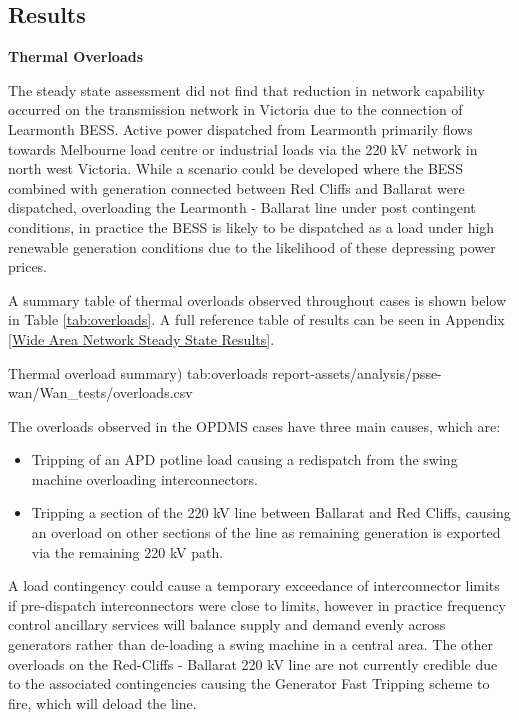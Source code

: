 \documentclass{../grid-link-report}
\begin{document}
	\subsection{Results}
	
	\textbf{Thermal Overloads}
	
	The steady state assessment did not find that reduction in network capability occurred on the transmission network in Victoria due to the connection of Learmonth BESS. Active power dispatched from Learmonth primarily flows towards Melbourne load centre or industrial loads via the 220 kV network in north west Victoria. While a scenario could be developed where the BESS combined with generation connected between Red Cliffs and Ballarat were dispatched, overloading the Learmonth - Ballarat line under post contingent conditions, in practice the BESS is likely to be dispatched as a load under high renewable generation conditions due to the likelihood of these depressing power prices. 
	
	A summary table of thermal overloads observed throughout cases is shown below in Table \ref{tab:overloads}. A full reference table of results can be seen in Appendix \ref{Wide Area Network Steady State Results}.
	
	{
		\fontsize{9}{13}\selectfont
		\autoscaledlongtable
		{Thermal overload summary)}
		{tab:overloads}
		{report-assets/analysis/psse-wan/Wan_tests/overloads.csv}
	}
	
	The overloads observed in the OPDMS cases have three main causes, which are:
	
	\begin{itemize}
		\item Tripping of an APD potline load causing a redispatch from the swing machine overloading interconnectors.
		\item Tripping a section of the 220 kV line between Ballarat and Red Cliffs, causing an overload on other sections of the line as remaining generation is exported via the remaining 220 kV path.
	\end{itemize}
	
	A load contingency could cause a temporary exceedance of interconnector limits if pre-dispatch interconnectors were close to limits, however in practice frequency control ancillary services will balance supply and demand evenly across generators rather than de-loading a swing machine in a central area. The other overloads on the Red-Cliffs - Ballarat 220 kV line are not currently credible due to the associated contingencies causing the Generator Fast Tripping scheme to fire, which will deload the line.
	
\end{document}

